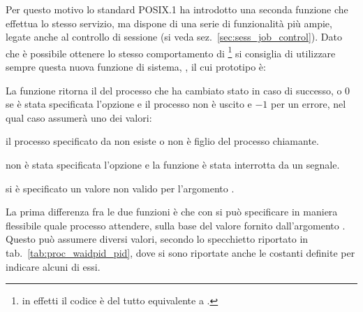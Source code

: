 Per questo motivo lo standard POSIX.1 ha introdotto una seconda funzione che
effettua lo stesso servizio, ma dispone di una serie di funzionalità più
ampie, legate anche al controllo di sessione (si veda
sez.~\ref{sec:sess_job_control}).  Dato che è possibile ottenere lo stesso
comportamento di \footnote{in effetti il codice
   è del tutto equivalente a .} si consiglia di utilizzare sempre questa nuova funzione di
sistema, , il cui prototipo è:

\begin{funcproto}{ 
}
{La funzione ritorna il  del processo che ha cambiato stato in caso
  di successo, o 0 se è stata specificata l'opzione  e il
  processo non è uscito e $-1$ per un errore, nel qual caso 
  assumerà uno dei valori:
  \begin{errlist}
  \item[\errcode{ECHILD}] il processo specificato da  non esiste o
    non è figlio del processo chiamante.
  \item[\errcode{EINTR}] non è stata specificata l'opzione  e
    la funzione è stata interrotta da un segnale.
  \item[\errcode{EINVAL}] si è specificato un valore non valido per
    l'argomento .
  \end{errlist}}
\end{funcproto}

La prima differenza fra le due funzioni è che con  si può
specificare in maniera flessibile quale processo attendere, sulla base del
valore fornito dall'argomento . Questo può assumere diversi valori,
secondo lo specchietto riportato in tab.~\ref{tab:proc_waidpid_pid}, dove si
sono riportate anche le costanti definite per indicare alcuni di essi.

